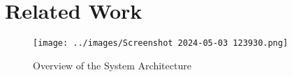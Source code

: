 \section{Related Work}
\begin{figure*}[!htb]
    \centering
    \texttt{[image: ../images/Screenshot 2024-05-03 123930.png]}
    \caption{Overview of the System Architecture}
    \label{fig:systemarch}
\end{figure*}
